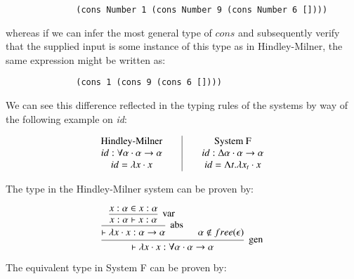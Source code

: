             \begin{verbatim}
              (cons Number 1 (cons Number 9 (cons Number 6 [])))  
            \end{verbatim}
            
            whereas if we can infer the most general type of $cons$ and
            subsequently verify that the supplied input is some instance of this
            type as in Hindley-Milner, the same expression might be written as:
            
            \begin{verbatim}
              (cons 1 (cons 9 (cons 6 [])))  
            \end{verbatim}
            
            We can see this difference reflected in the typing rules of the
            systems by way of the following example on \emph{id}:
            
            \[\begin{array}{c@{\qquad}|@{\qquad}c}
                  \mbox{Hindley-Milner}
                  &
                  \mbox{System F}
                  \\
                  id : \forall \alpha \cdot \alpha \to \alpha
                  &
                  id : \Delta \alpha \cdot \alpha \to \alpha
                  \\                  id = \lambda x \cdot x
                  &
                  id = \Lambda t . \lambda x_t \cdot x
            \end{array} \]
            
            The type in the Hindley-Milner system can be proven by:
            
            
            \[\begin{array}{c}
            \mbox{\begin{prooftree}
                    \hypo{x : \alpha \in x : \alpha}   
                  \infer1[var]{x : \alpha \vdash x : \alpha}
                \infer1[abs]{\vdash \lambda x \cdot x : \alpha \to \alpha}
                \hypo{\alpha \notin free(\epsilon)}
               \infer2[gen]{\vdash \lambda x \cdot x : \forall \alpha \cdot
               \alpha \to \alpha}
            \end{prooftree}}
            \end{array} \]
            
            
            The equivalent type in System F can be proven by:
            
